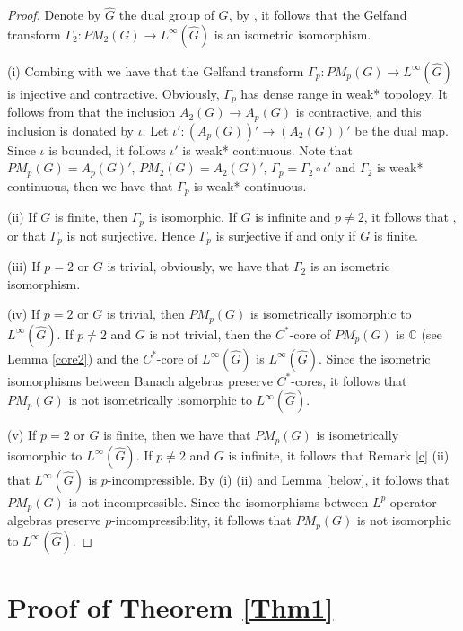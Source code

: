 \documentclass[reqno,11pt]{amsart}
\theoremstyle{plain}
\theoremstyle{definition}
\theoremstyle{remark}
\begin{document}
\begin{proof}
Denote by $\hat{G}$ the dual group of $G$,
by \cite[Theorem 2 on page 13]{Der}, it follows that the Gelfand transform $\Gamma_2:PM_2(G)\rightarrow L^\infty(\hat{G})$ is an isometric isomorphism.

(i) Combing with \cite[Theorem 4 on page 19]{Der} we have that the Gelfand transform $\Gamma_p: PM_p(G)\rightarrow L^\infty(\hat{G})$ is injective and contractive. Obviously, $\Gamma_p$ has dense range in weak* topology.
It follows from \cite[Theorem 7 on page55]{Der} that the inclusion $A_2(G)\rightarrow A_p(G)$ is contractive, and this inclusion is donated by $\iota$.
Let $\iota':(A_p(G))'\rightarrow (A_2(G))'$ be the dual map. Since $\iota$ is bounded, it follows $\iota'$ is weak* continuous. Note that $PM_p(G)=A_p(G)'$, $PM_2(G)=A_2(G)'$, $\Gamma_p=\Gamma_2\circ\iota'$ and $\Gamma_2$ is weak* continuous, then we have that $\Gamma_p$ is weak* continuous.

(ii) If $G$ is finite, then $\Gamma_p$ is isomorphic. If $G$ is infinite and $p\neq 2$, it follows that \cite[Remark 1 on page 54]{Der}, \cite{F} or \cite[Theorem 4.5.2]{Lar} that $\Gamma_p$ is not surjective. Hence $\Gamma_p$ is surjective if and only if $G$ is finite.

(iii) If $p=2$ or $G$ is trivial, obviously, we have that $\Gamma_2$ is an isometric isomorphism.

(iv) If $p=2$ or $G$ is trivial, then $PM_p(G)$ is isometrically isomorphic to $L^\infty(\hat{G})$.
If $p\neq 2$ and $G$ is not trivial, then the $C^*$-core of $PM_p(G)$ is $\mathbb{C}$ (see Lemma \ref{core2}) and the $C^*$-core of $L^\infty(\hat{G})$ is $L^\infty(\hat{G})$. Since the isometric isomorphisms between Banach algebras preserve $C^*$-cores, it follows that $PM_p(G)$ is not isometrically isomorphic to $L^\infty(\hat{G})$.


(v) If $p=2$ or $G$ is finite, then we have that $PM_p(G)$ is isometrically isomorphic to $L^\infty(\hat{G})$. If $p\neq 2$ and $G$ is infinite, it follows that Remark \ref{c} (ii) that $L^\infty(\hat{G})$ is $p$-incompressible.
By (i) (ii) and Lemma \ref{below}, it follows that $PM_p(G)$ is not incompressible. Since the isomorphisms between $L^p$-operator algebras preserve $p$-incompressibility, it follows that $PM_p(G)$ is not isomorphic to $L^\infty(\hat{G})$.
\end{proof}





\section{Proof of Theorem \ref{Thm1}}
\end{document}
